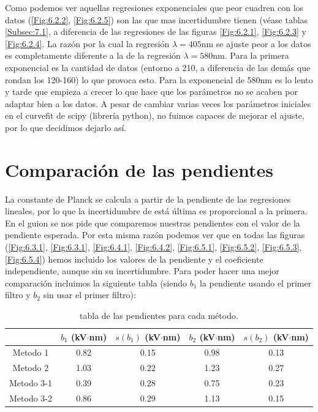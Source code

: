 \documentclass[12pt,a4paper]{article}
\numberwithin{equation}{section}
\numberwithin{table}{section}
\numberwithin{figure}{section}
\begin{document}
Como podemos ver aquellas regresiones exponenciales que peor cuadren con los datos (\ref{Fig:6.2.2}, \ref{Fig:6.2.5}) son las que mas incertidumbre tienen (véase tablas \ref{Subsec:7.1}, a diferencia de las regresiones de las figuras \ref{Fig:6.2.1},  \ref{Fig:6.2.3} y \ref{Fig:6.2.4}. La razón por la cual la regresión $\lambda =405$nm se ajuste peor a los datos es completamente diferente a la de la regresión $\lambda =580$nm. Para la primera exponencial es la cantidad de datos (entorno a 210, a diferencia de las demás que rondan los 120-160) lo que provoca esto. Para la exponencial de 580nm es lo lento y tarde que empieza a crecer lo que hace que los parámetros no se acaben por adaptar bien a los datos. A pesar de cambiar varias veces los parámetros iniciales en el curvefit de scipy (librería python), no fuimos capaces de mejorar el ajuste, por lo que decidimos dejarlo así. 

\section{Comparación de las pendientes}
 
La constante de Planck se calcula a partir de la pendiente de las regresiones lineales, por lo que la incertidumbre de está última es proporcional a la primera. En el guion se nos pide que comparemos nuestras pendientes con el valor de la pendiente esperada. Por esta misma razón podemos ver que en todas las figuras (\ref{Fig:6.3.1}, \ref{Fig:6.3.1}, \ref{Fig:6.4.1}, \ref{Fig:6.4.2}, \ref{Fig:6.5.1}, \ref{Fig:6.5.2}, \ref{Fig:6.5.3}, \ref{Fig:6.5.4}) hemos incluido los valores de la pendiente y el coeficiente independiente, aunque sin su incertidumbre. Para poder hacer una mejor comparación incluimos la siguiente tabla (siendo $b_1$ la pendiente usando el primer filtro y $b_2$ sin usar el primer filtro):

\begin{table}[h!] \centering 
\begin{tabular}{c|c|c|c|c} 
 & $b_{1}$ (kV$\cdot$nm) & $s(b_{1})$ (kV$\cdot$nm) & $b_{2}$ (kV$\cdot$nm) & $s(b_{2})$ (kV$\cdot$nm) \\ \hline 
Metodo 1  & 0.82  & 0.15 & 0.98  & 0.13  \\ 
Metodo 2  & 1.03  & 0.22 & 1.23  & 0.27  \\ 
Metodo 3-1  & 0.39  & 0.28 & 0.75  & 0.23  \\ 
Metodo 3-2  & 0.86  & 0.29 & 1.13  & 0.15  \\ 
\end{tabular}\caption{tabla de las pendientes para cada método.} 
\label{Tab:00} 
\end{table} 
\end{document}
